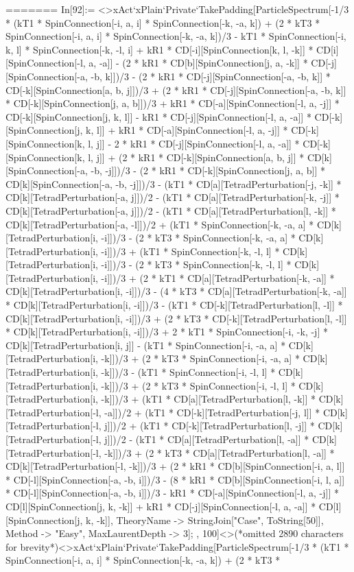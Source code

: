 =======
In[92]:= <>xAct`xPlain`Private`TakePadding[ParticleSpectrum[-1/3 * (kT1 * SpinConnection[-i, a, i] * SpinConnection[-k, -a, k]) + (2 * kT3 * SpinConnection[-i, a, i] * SpinConnection[-k, -a, k])/3 - kT1 * SpinConnection[-i, k, l] * SpinConnection[-k, -l, i] + kR1 * CD[-i][SpinConnection[k, l, -k]] * CD[i][SpinConnection[-l, a, -a]] - (2 * kR1 * CD[b][SpinConnection[j, a, -k]] * CD[-j][SpinConnection[-a, -b, k]])/3 - (2 * kR1 * CD[-j][SpinConnection[-a, -b, k]] * CD[-k][SpinConnection[a, b, j]])/3 + (2 * kR1 * CD[-j][SpinConnection[-a, -b, k]] * CD[-k][SpinConnection[j, a, b]])/3 + kR1 * CD[-a][SpinConnection[-l, a, -j]] * CD[-k][SpinConnection[j, k, l]] - kR1 * CD[-j][SpinConnection[-l, a, -a]] * CD[-k][SpinConnection[j, k, l]] + kR1 * CD[-a][SpinConnection[-l, a, -j]] * CD[-k][SpinConnection[k, l, j]] - 2 * kR1 * CD[-j][SpinConnection[-l, a, -a]] * CD[-k][SpinConnection[k, l, j]] + (2 * kR1 * CD[-k][SpinConnection[a, b, j]] * CD[k][SpinConnection[-a, -b, -j]])/3 - (2 * kR1 * CD[-k][SpinConnection[j, a, b]] * CD[k][SpinConnection[-a, -b, -j]])/3 - (kT1 * CD[a][TetradPerturbation[-j, -k]] * CD[k][TetradPerturbation[-a, j]])/2 - (kT1 * CD[a][TetradPerturbation[-k, -j]] * CD[k][TetradPerturbation[-a, j]])/2 - (kT1 * CD[a][TetradPerturbation[l, -k]] * CD[k][TetradPerturbation[-a, -l]])/2 + (kT1 * SpinConnection[-k, -a, a] * CD[k][TetradPerturbation[i, -i]])/3 - (2 * kT3 * SpinConnection[-k, -a, a] * CD[k][TetradPerturbation[i, -i]])/3 + (kT1 * SpinConnection[-k, -l, l] * CD[k][TetradPerturbation[i, -i]])/3 - (2 * kT3 * SpinConnection[-k, -l, l] * CD[k][TetradPerturbation[i, -i]])/3 + (2 * kT1 * CD[a][TetradPerturbation[-k, -a]] * CD[k][TetradPerturbation[i, -i]])/3 - (4 * kT3 * CD[a][TetradPerturbation[-k, -a]] * CD[k][TetradPerturbation[i, -i]])/3 - (kT1 * CD[-k][TetradPerturbation[l, -l]] * CD[k][TetradPerturbation[i, -i]])/3 + (2 * kT3 * CD[-k][TetradPerturbation[l, -l]] * CD[k][TetradPerturbation[i, -i]])/3 + 2 * kT1 * SpinConnection[-i, -k, -j] * CD[k][TetradPerturbation[i, j]] - (kT1 * SpinConnection[-i, -a, a] * CD[k][TetradPerturbation[i, -k]])/3 + (2 * kT3 * SpinConnection[-i, -a, a] * CD[k][TetradPerturbation[i, -k]])/3 - (kT1 * SpinConnection[-i, -l, l] * CD[k][TetradPerturbation[i, -k]])/3 + (2 * kT3 * SpinConnection[-i, -l, l] * CD[k][TetradPerturbation[i, -k]])/3 + (kT1 * CD[a][TetradPerturbation[l, -k]] * CD[k][TetradPerturbation[-l, -a]])/2 + (kT1 * CD[-k][TetradPerturbation[-j, l]] * CD[k][TetradPerturbation[-l, j]])/2 + (kT1 * CD[-k][TetradPerturbation[l, -j]] * CD[k][TetradPerturbation[-l, j]])/2 - (kT1 * CD[a][TetradPerturbation[l, -a]] * CD[k][TetradPerturbation[-l, -k]])/3 + (2 * kT3 * CD[a][TetradPerturbation[l, -a]] * CD[k][TetradPerturbation[-l, -k]])/3 + (2 * kR1 * CD[b][SpinConnection[-i, a, l]] * CD[-l][SpinConnection[-a, -b, i]])/3 - (8 * kR1 * CD[b][SpinConnection[-i, l, a]] * CD[-l][SpinConnection[-a, -b, i]])/3 - kR1 * CD[-a][SpinConnection[-l, a, -j]] * CD[l][SpinConnection[j, k, -k]] + kR1 * CD[-j][SpinConnection[-l, a, -a]] * CD[l][SpinConnection[j, k, -k]], TheoryName -> StringJoin["Case", ToString[50]], Method -> "Easy", MaxLaurentDepth -> 3]; , 100]<>(*omitted 2890 characters for brevity*)<>xAct`xPlain`Private`TakePadding[ParticleSpectrum[-1/3 * (kT1 * SpinConnection[-i, a, i] * SpinConnection[-k, -a, k]) + (2 * kT3 * 